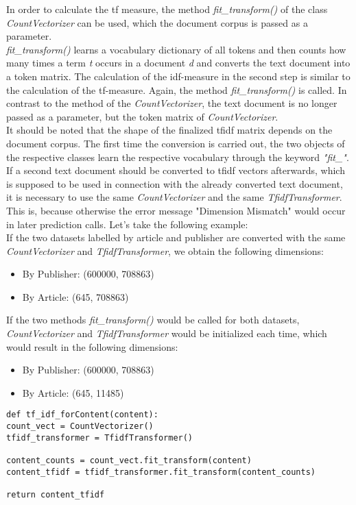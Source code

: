 \documentclass[a4paper, 11pt,titlepage,oneside,openany]{book}
\begin{document}
In order to calculate the \gls{tf} measure, the method \textit{fit\_transform()} of the class \textit{CountVectorizer} can be used, which the document corpus is passed as a parameter. \\
\noindent \textit{fit\_transform()} learns a vocabulary dictionary of all tokens and then counts how many times a term \textit{t} occurs in a document \textit{d} and converts the text document into a token matrix.
\noindent The calculation of the \gls{idf}-measure in the second step is similar to the calculation of the \gls{tf}-measure. Again, the method \textit{fit\_transform()} is called. In contrast to the method of the \textit{CountVectorizer}, the text document is no longer passed as a parameter, but the token matrix of \textit{CountVectorizer}. \\
\indent It should be noted that the shape of the finalized \gls{tfidf} matrix depends on the document corpus. The first time the conversion is carried out, the two objects of the respective classes learn the respective vocabulary through the keyword \textit{"fit\_"}. If a second text document should be converted to \gls{tfidf} vectors afterwards, which is supposed to be used in connection with the already converted text document, it is necessary to use the same \textit{CountVectorizer} and the same \textit{TfidfTransformer}. This is, because otherwise the error message "Dimension Mismatch" would occur in later prediction calls.
Let's take the following example: \\
\noindent If the two datasets labelled by article and publisher are converted with the same \textit{CountVectorizer} and \textit{TfidfTransformer}, we obtain the following dimensions:
\begin{itemize}
	\item By Publisher: (600000, 708863)
	\item By Article: (645, 708863)	
\end{itemize}
\newpage
\noindent If the two methods \textit{fit\_transform()} would be called for both datasets, \textit{CountVectorizer} and \textit{TfidfTransformer} would be initialized each time, which would result in the following dimensions:
\begin{itemize}
	\item By Publisher: (600000, 708863)
	\item By Article: (645, 11485)	
\end{itemize}
\begin{lstlisting}[caption=\gls{tfidf}]
def tf_idf_forContent(content):
count_vect = CountVectorizer()
tfidf_transformer = TfidfTransformer()

content_counts = count_vect.fit_transform(content)
content_tfidf = tfidf_transformer.fit_transform(content_counts)

return content_tfidf
\end{lstlisting}
\end{document}
